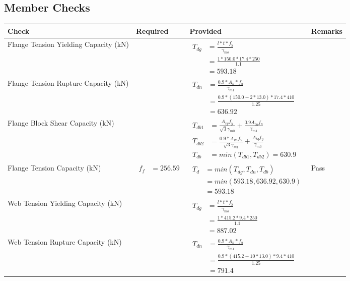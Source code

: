 \documentclass{article}%
\begin{document}
%
\newpage%
\subsection{Member Checks}%
\label{subsec:MemberChecks}%
\renewcommand{\arraystretch}{1.2}%
\begin{longtable}{|p{4cm}|p{6cm}|p{5.5cm}|p{1.5cm}|}%
\hline%
\rowcolor{OsdagGreen}%
Check&Required&Provided&Remarks\\%
\hline%
\endhead%
\hline%
Flange Tension Yielding Capacity (kN)&&$\begin{aligned} T_{dg} &= \frac{l*t*f_y}{\gamma_{mo}}\\ &=\frac{1*150.0*17.4*250}{1.1}\\ &=593.18\end{aligned}$&\\%
\hline%
Flange Tension Rupture Capacity (kN)&&$\begin{aligned} T_{dn} &= \frac{0.9*A_{n}*f_u}{\gamma_{m1}}\\ &=\frac{0.9*(150.0-2*13.0)*17.4*410}{1.25}\\ &=636.92\end{aligned}$&\\%
\hline%
Flange Block Shear Capacity (kN)&&$\begin{aligned}T_{db1} &= \frac{A_{vg} f_{y}}{\sqrt{3} \gamma_{m0}} + \frac{0.9 A_{tn} f_{u}}{\gamma_{m1}}\\ T_{db2} &= \frac{0.9*A_{vn} f_{u}}{\sqrt{3} \gamma_{m1}} + \frac{A_{tg} f_{y}}{\gamma_{m0}}\\ T_{db} &= min(T_{db1}, T_{db2})= 630.9\end{aligned}$&\\%
\hline%
Flange Tension Capacity (kN)&$\begin{aligned} f_f &=256.59\end{aligned}$&$\begin{aligned} T_d &= min(T_{dg},T_{dn},T_{db})\\ &= min(593.18,636.92,630.9)\\ &=593.18\end{aligned}$&Pass\\%
\hline%
Web Tension Yielding Capacity (kN)&&$\begin{aligned} T_{dg} &= \frac{l*t*f_y}{\gamma_{mo}}\\ &=\frac{1*415.2*9.4*250}{1.1}\\ &=887.02\end{aligned}$&\\%
\hline%
Web Tension Rupture Capacity (kN)&&$\begin{aligned} T_{dn} &= \frac{0.9*A_{n}*f_u}{\gamma_{m1}}\\ &=\frac{0.9*(415.2-10*13.0)*9.4*410}{1.25}\\ &=791.4\end{aligned}$&\\%

\end{longtable}
\end{document}
